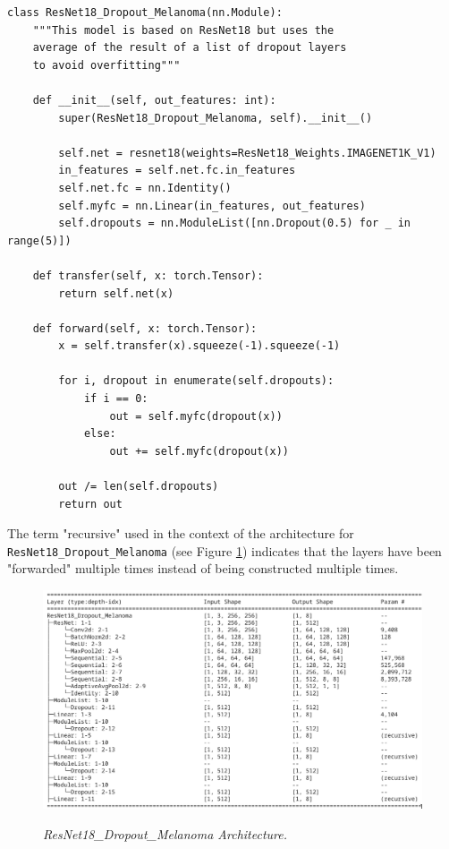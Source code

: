 \begin{Verbatim}[fontsize=\scriptsize]
class ResNet18_Dropout_Melanoma(nn.Module):
    """This model is based on ResNet18 but uses the
    average of the result of a list of dropout layers
    to avoid overfitting"""

    def __init__(self, out_features: int):
        super(ResNet18_Dropout_Melanoma, self).__init__()

        self.net = resnet18(weights=ResNet18_Weights.IMAGENET1K_V1)
        in_features = self.net.fc.in_features
        self.net.fc = nn.Identity()
        self.myfc = nn.Linear(in_features, out_features)
        self.dropouts = nn.ModuleList([nn.Dropout(0.5) for _ in range(5)])

    def transfer(self, x: torch.Tensor):
        return self.net(x)

    def forward(self, x: torch.Tensor):
        x = self.transfer(x).squeeze(-1).squeeze(-1)

        for i, dropout in enumerate(self.dropouts):
            if i == 0:
                out = self.myfc(dropout(x))
            else:
                out += self.myfc(dropout(x))

        out /= len(self.dropouts)
        return out
\end{Verbatim}

The term "recursive" used in the context of the architecture for
\texttt{ResNet18\_Dropout\_Melanoma} (see Figure
\ref{fig:resnet-18-dropout-melanoma-arch}) indicates that the layers have been
"forwarded" multiple times instead of being constructed multiple times.

\begin{figure}[H]
  \centering
  \includegraphics[width=\textwidth]{imatges/methodological_contribution/ResNet18_Dropout_Melanoma.png}
  \caption[ResNet18\_Dropout\_Melanoma
  Architecture]{\textit{ResNet18\_Dropout\_Melanoma Architecture.
  }}
  {\label{fig:resnet-18-dropout-melanoma-arch}}
\end{figure}

